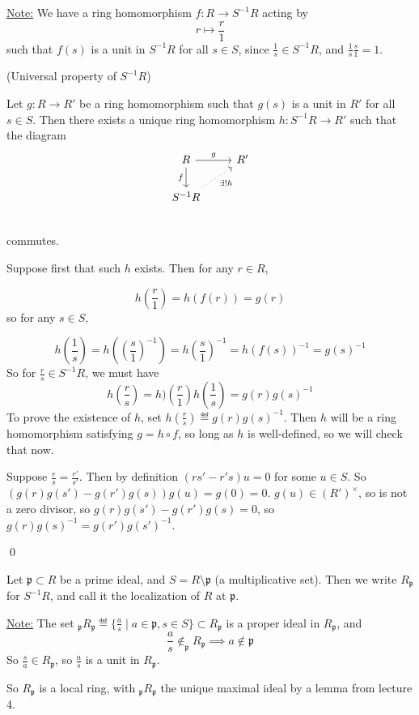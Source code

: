 \documentclass[x11names,reqno,14pt]{extarticle}
\newcommand{\mk}[1]{\mathfrak{#1}}
\begin{document}
\underline{Note:} We have a ring homomorphism $f:R\to S^{-1}R$ acting by 
\[
r\mapsto\frac{r}{1}
\]
such that $f(s)$ is a unit in $S^{-1}R$ for all $s \in S$, since $\frac{1}{s} \in S^{-1}R$, and $\frac{1}{s}\frac{s}{1} = 1$.

\prop (Universal property of $S^{-1}R$)

Let $g:R\to R'$ be a ring homomorphism such that $g(s)$ is a unit in $R'$ for all $s \in S$. Then there exists a unique ring homomorphism $h:S^{-1}R\to R'$ such that the diagram
\[
\begin{tikzcd}
R\ar[d, "f"'] \ar[r, "g"] & R' \\
S^{-1}R\ar[ur, "\exists!h"', dotted] \\
\end{tikzcd}
\] 
commutes. 

\proof

Suppose first that such $h$ exists. Then for any $r \in R$, 

\[
h(\frac{r}{1}) = h(f(r)) = g(r)
\]
so for any $s \in S,$

\[
h(\frac{1}{s}) = h((\frac{s}{1})^{-1}) = h(\frac{s}{1})^{-1} = h(f(s))^{-1} = g(s)^{-1}
\]
So for $\frac{r}{s} \in S^{-1}R$, we must have
\[
h(\frac{r}{s}) = h)(\frac{r}{1})h(\frac{1}{s}) = g(r)g(s)^{-1}
\]
To prove the existence of $h$, set $h(\frac{r}{s}) \eqdef g(r)g(s)^{-1}$. Then $h$ will be a ring homomorphism satisfying $g = h \circ f$, so long as $h$ is well-defined, so we will check that now. 

Suppose $\frac{r}{s} = \frac{r'}{s'}$. Then by definition $(rs' - r's)u = 0$ for some $u \in S$. So $(g(r)g(s') - g(r')g(s))g(u) = g(0) = 0$. $g(u) \in (R')^\times$, so is not a zero divisor, so $g(r)g(s') - g(r')g(s) = 0$, so $g(r)g(s)^{-1} = g(r')g(s')^{-1}$.

\qed

\exm

Let $\mk{p}\subset R$ be a prime ideal, and $S = R\setminus\mk{p}$ (a multiplicative set). Then we write $R_{\mk{p}}$ for $S^{-1}R$, and call it the localization of $R$ at $\mk{p}$. 

\underline{Note:} The set $_{\mk{p}}R_{\mk{p}}\eqdef\{\frac{a}{s}\mid a\in\mk{p}, s \in S\} \subset R_\mk{p}$ is a proper ideal in $R_\mk{p}$, and
\[
\frac{a}{s}\not\in _\mk{p}R_{\mk{p}} \implies a\not\in\mk{p}
\]
So $\frac{s}{a} \in R_\mk{p}$, so $\frac{a}{s}$ is a unit in $R_{\mk{p}}$. 

So $R_\mk{p}$ is a local ring, with $_\mk{p}R_\mk{p}$ the unique maximal ideal by a lemma from lecture 4. 
\end{document}
